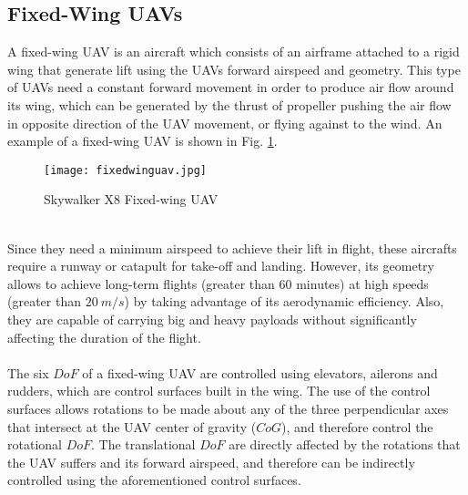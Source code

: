 \subsection{Fixed-Wing UAVs}
A fixed-wing UAV is an aircraft which consists of an airframe attached to a rigid wing that generate lift using the UAVs forward airspeed and geometry. This type of UAVs need a constant forward movement in order to produce air flow around its wing, which can be generated by the thrust of propeller pushing the air flow in opposite direction of the UAV movement, or flying against to the wind. An example of a fixed-wing UAV is shown in Fig. \ref{fig:fixedwing}.
\begin{figure}[h]
\begin{center}
\texttt{[image: fixedwinguav.jpg]}    
\caption[Skywalker X8 Fixed-wing UAV]{Skywalker X8 Fixed-wing UAV\protect\footnotemark} 
\label{fig:fixedwing}
\end{center}
\end{figure}
\\Since they need a minimum airspeed to achieve their lift in flight, these aircrafts require a runway or catapult for take-off and landing. However, its geometry allows to achieve long-term flights (greater than $60$ minutes) at high speeds (greater than $20\ m/s$) by taking advantage of its aerodynamic efficiency. Also, they are capable of carrying big and heavy payloads without significantly affecting the duration of the flight.
\\\\
The six $DoF$ of a fixed-wing UAV are controlled using elevators, ailerons and rudders, which are control surfaces built in the wing. The use of the control surfaces allows rotations to be made about any of the three perpendicular axes that intersect at the UAV center of gravity ($CoG$), and therefore control the rotational $DoF$. The translational $DoF$ are directly affected by the rotations that the UAV suffers and its forward airspeed, and therefore can be indirectly controlled using the aforementioned control surfaces.

